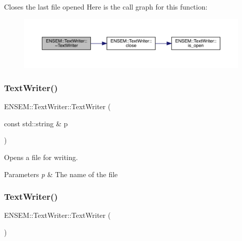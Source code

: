 Closes the last file opened Here is the call graph for this function\+:\nopagebreak
\begin{figure}[H]
\begin{center}
\leavevmode
\includegraphics[width=350pt]{db/d53/classENSEM_1_1TextWriter_a2aa3ba4260c005b4a2910046448cc193_cgraph}
\end{center}
\end{figure}
\mbox{\label{classENSEM_1_1TextWriter_abbaa16dfaccb062fc8cea4ce2abf3215}} 
\subsubsection{\texorpdfstring{TextWriter()}{TextWriter()}\hspace{0.1cm}{\footnotesize\ttfamily [2/4]}}
{\footnotesize\ttfamily E\+N\+S\+E\+M\+::\+Text\+Writer\+::\+Text\+Writer (\begin{DoxyParamCaption}\item[{const std\+::string \&}]{p }\end{DoxyParamCaption})\hspace{0.3cm}{\ttfamily [explicit]}}

Opens a file for writing. 
\begin{DoxyParams}{Parameters}
{\em p} & The name of the file \\
\hline
\end{DoxyParams}
\mbox{\label{classENSEM_1_1TextWriter_ad0b4ad57a3e91011920a473244447cac}} 
\subsubsection{\texorpdfstring{TextWriter()}{TextWriter()}\hspace{0.1cm}{\footnotesize\ttfamily [3/4]}}
{\footnotesize\ttfamily E\+N\+S\+E\+M\+::\+Text\+Writer\+::\+Text\+Writer (\begin{DoxyParamCaption}{ }\end{DoxyParamCaption})}

